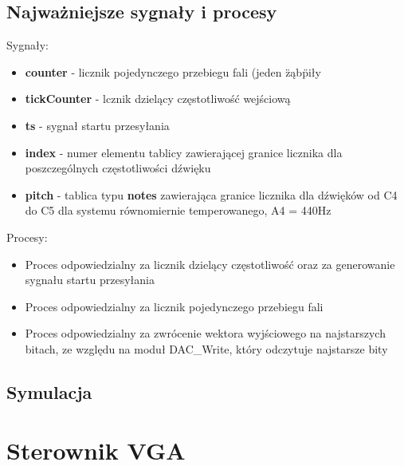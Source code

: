 \documentclass[a4paper]{report}
\begin{document}
		\subsection{Najważniejsze sygnały i procesy}
		{\Large Sygnały:}
			\begin{itemize}
				\item \textbf{counter} - licznik pojedynczego przebiegu fali (jeden \"ząb\" piły
				\item \textbf{tickCounter} - lcznik dzielący częstotliwość wejściową
				\item \textbf{ts} - sygnał startu przesyłania
				\item \textbf{index} - numer elementu tablicy zawierającej granice licznika dla poszczególnych częstotliwości dźwięku
				\item \textbf{pitch} - tablica typu \textbf{notes} zawierająca granice licznika dla dźwięków od C4 do C5 dla systemu równomiernie temperowanego, A4 = 440Hz
			\end{itemize}
		{\Large Procesy:}
			\begin{itemize}
			\item Proces odpowiedzialny za licznik dzielący częstotliwość oraz za generowanie sygnału startu przesyłania\\
						
			\item Proces odpowiedzialny za licznik pojedynczego przebiegu fali\\
									
			\item Proces odpowiedzialny za zwrócenie wektora wyjściowego na najstarszych bitach, ze względu na moduł DAC\_Write, który odczytuje najstarsze bity\\
									
			\end{itemize}
		\subsection{Symulacja}
		\newpage
	\section{Sterownik VGA}
\end{document}
